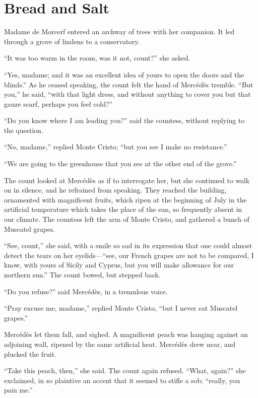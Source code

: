 \chapter{Bread and Salt}

Madame de Morcerf entered an archway of trees with her companion. It
led through a grove of lindens to a conservatory.

“It was too warm in the room, was it not, count?” she asked.

“Yes, madame; and it was an excellent idea of yours to open the doors
and the blinds.” As he ceased speaking, the count felt the hand of
Mercédès tremble. “But you,” he said, “with that light dress, and
without anything to cover you but that gauze scarf, perhaps you feel
cold?”

“Do you know where I am leading you?” said the countess, without
replying to the question.

“No, madame,” replied Monte Cristo; “but you see I make no resistance.”

“We are going to the greenhouse that you see at the other end of the
grove.”

The count looked at Mercédès as if to interrogate her, but she
continued to walk on in silence, and he refrained from speaking. They
reached the building, ornamented with magnificent fruits, which ripen
at the beginning of July in the artificial temperature which takes the
place of the sun, so frequently absent in our climate. The countess
left the arm of Monte Cristo, and gathered a bunch of Muscatel grapes.

“See, count,” she said, with a smile so sad in its expression that one
could almost detect the tears on her eyelids—“see, our French grapes
are not to be compared, I know, with yours of Sicily and Cyprus, but
you will make allowance for our northern sun.” The count bowed, but
stepped back.

“Do you refuse?” said Mercédès, in a tremulous voice.

“Pray excuse me, madame,” replied Monte Cristo, “but I never eat
Muscatel grapes.”

Mercédès let them fall, and sighed. A magnificent peach was hanging
against an adjoining wall, ripened by the same artificial heat.
Mercédès drew near, and plucked the fruit.

“Take this peach, then,” she said. The count again refused. “What,
again?” she exclaimed, in so plaintive an accent that it seemed to
stifle a sob; “really, you pain me.”

